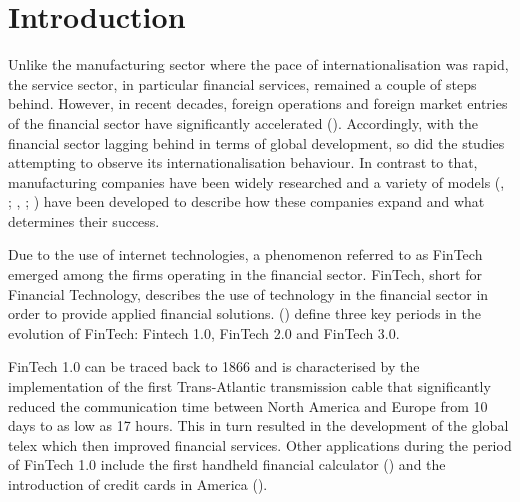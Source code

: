 \documentclass[11pt,a4paper]{article}
\begin{document}
\section{Introduction}
\label{intro}
\par
Unlike the manufacturing sector where the pace of internationalisation was rapid, the service sector, in particular financial services, remained a couple of steps behind. However, in recent decades, foreign operations and foreign market entries of the financial sector have significantly accelerated (\cite{hannounInternationalisationFinancialServices2006}). Accordingly, with the financial sector lagging behind in terms of global development, so did the studies attempting to observe its internationalisation behaviour. In contrast to that, manufacturing companies have been widely researched and a variety of models (\cite{dunningEclecticTheoryInternational1980}, \citeyear{dunningEclecticParadigmEnvelope2000}; \cite{johansonInternationalizationProcessFirm1977}, \citeyear{johansonUppsalaInternationalizationProcess2009}; \cite{rennieGlobalCompetitivenessBorn1993}) have been developed to describe how these companies expand and what determines their success. \par
Due to the use of internet technologies, a phenomenon referred to as FinTech emerged among the firms operating in the financial sector. FinTech, short for Financial Technology, describes the use of technology in the financial sector in order to provide applied financial solutions. \citeauthor{buckleyEvolutionFintechNew2016} (\citeyear{buckleyEvolutionFintechNew2016}) define three key periods in the evolution of FinTech: Fintech 1.0, FinTech 2.0 and FinTech 3.0.\par
FinTech 1.0 can be traced back to 1866 and is characterised by the implementation of the first Trans-Atlantic transmission cable that significantly reduced the communication time between North America and Europe from 10 days to as low as 17 hours. This in turn resulted in the development of the global telex which then improved financial services. Other applications during the period of FinTech 1.0 include the first handheld financial calculator (\cite{thibodeauTIFirstHandheld2007}) and the introduction of credit cards in America (\cite{markhamFinancialHistoryUnited2015}). \par
\end{document}
